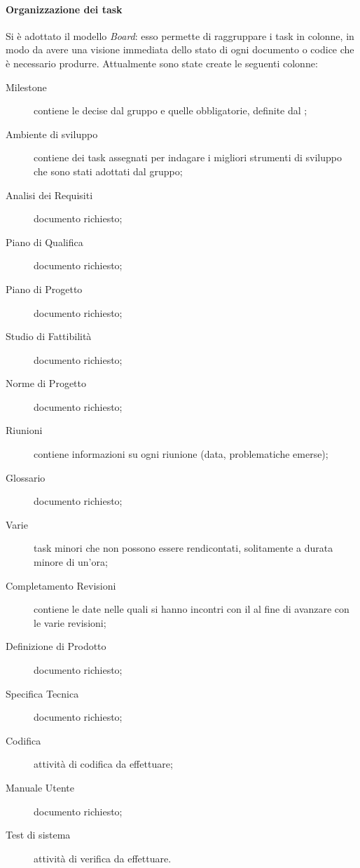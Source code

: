 \paragraph{Organizzazione dei task} Si è adottato il modello \emph{Board}: esso permette di raggruppare i task in colonne, in modo da avere una visione immediata dello stato di ogni documento o codice che è necessario produrre.
Attualmente sono state create le seguenti colonne:
\begin{description}
	\item[Milestone] contiene le  decise dal gruppo e quelle obbligatorie, definite dal \TV;
	\item[Ambiente di sviluppo] contiene dei task assegnati per indagare i migliori strumenti di sviluppo che sono stati adottati dal gruppo;
	\item[Analisi dei Requisiti] documento richiesto;
	\item[Piano di Qualifica] documento richiesto;
	\item[Piano di Progetto] documento richiesto;
	\item[Studio di Fattibilità] documento richiesto;
	\item[Norme di Progetto] documento richiesto;
	\item[Riunioni] contiene informazioni su ogni riunione (data, problematiche emerse);
	\item[Glossario] documento richiesto;
	\item[Varie] task minori che non possono essere rendicontati, solitamente a durata minore di un'ora;
	\item[Completamento Revisioni] contiene le date nelle quali si hanno incontri con il \TV al fine di avanzare con le varie revisioni; 
	\item[Definizione di Prodotto] documento richiesto;
	\item[Specifica Tecnica] documento richiesto;
	\item[Codifica] attività di codifica da effettuare;
	\item[Manuale Utente] documento richiesto;
	\item[Test di sistema] attività di verifica da effettuare.
\end{description}
